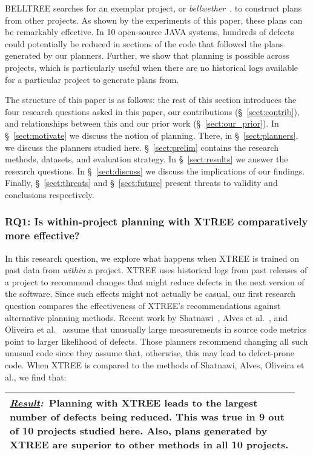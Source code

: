 \documentclass[smallextended]{svjour3}       %
\newcommand{\result}[1]{
\vspace{0.2cm}
\noindent\begin{minipage}{\linewidth}
\begin{tabular}{|p{0.95\linewidth}|}
\hline\vspace{-0.2cm}
\textbf{\textit{\underline{Result}:}}~#1\\\hline
\end{tabular}
\end{minipage}\bigstrut
}
\newcommand{\tion}[1]{\S~\ref{sect:#1}}
\begin{document}
BELLTREE searches for an exemplar project, or \textit{bellwether}~\cite{krishna17a}, to construct plans from other projects. As shown by
the experiments of this paper, these plans can be remarkably effective. In 10 open-source JAVA systems, hundreds of defects could potentially be reduced in sections of the code that followed the plans generated by our planners. Further, we show that planning is possible across projects, which is particularly useful when there are no historical logs available for a particular project to generate plans from.


The structure of this paper is as follows: the rest of this section introduces the four research questions asked in this paper, our contributions (\tion{contrib}), and relationships between this and our prior work (\tion{our_prior}). In \tion{motivate} we discuss the notion of planning. There, in \tion{planners}, we discuss the planners studied here. \tion{prelim} contains the research methods, datasets, and evaluation strategy. In \tion{results} we answer the research questions. In \tion{discuss} we discuss the implications of our findings. Finally, \tion{threats} and \tion{future} present threats to validity and conclusions respectively.

\subsubsection*{RQ1: Is within-project planning with XTREE comparatively more effective?}

In this research question, we explore what happens when XTREE  is trained on past data from \textit{within} a project. XTREE uses
historical logs from past releases of a project to recommend changes that might reduce defects in the next version of the software. Since such effects might not actually be casual, 
our first research question compares 
the effectiveness of XTREE's recommendations against  alternative planning methods. Recent work by Shatnawi~\cite{shatnawi}, Alves et al.~\cite{alves}, and Oliveira et al.~\cite{oliveira} assume that unusually large measurements in source code metrics point to larger likelihood of defects. Those
planners recommend changing all such unusual code since they assume that, otherwise, this may lead to defect-prone code. When XTREE is compared to the methods
of Shatnawi, Alves, Oliveira et al., we find that: 

\result{Planning with XTREE leads to the largest number of defects being reduced. This was true in 9 out of 10 projects studied here. Also, plans generated by XTREE are superior to other methods in all 10 projects.}
\end{document}
